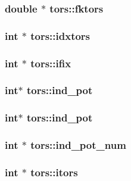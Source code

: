 \subsubsection{\setlength{\rightskip}{0pt plus 5cm}double $\ast$ {\bf tors::fktors}}\label{structtors_e02aa7c11c8a02a9c87fe7f5120b7963}


\subsubsection{\setlength{\rightskip}{0pt plus 5cm}int $\ast$ {\bf tors::idxtors}}\label{structtors_2afe40eb045b0f96b0e3248615e7d6a9}


\subsubsection{\setlength{\rightskip}{0pt plus 5cm}int $\ast$ {\bf tors::ifix}}\label{structtors_f4a3bddac55332d60cb2857607462380}


\subsubsection{\setlength{\rightskip}{0pt plus 5cm}int$\ast$ {\bf tors::ind\_\-pot}}\label{structtors_5df53ddd197439d37269b11f3809e7a0}


\subsubsection{\setlength{\rightskip}{0pt plus 5cm}int$\ast$ {\bf tors::ind\_\-pot}}\label{structtors_5df53ddd197439d37269b11f3809e7a0}


\subsubsection{\setlength{\rightskip}{0pt plus 5cm}int $\ast$ {\bf tors::ind\_\-pot\_\-num}}\label{structtors_24763f71934e590051b1e616cb44e2ab}


\subsubsection{\setlength{\rightskip}{0pt plus 5cm}int $\ast$ {\bf tors::itors}}\label{structtors_c217fce973aa2d53b9145abffe6700d3}


